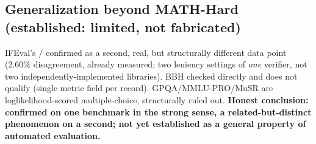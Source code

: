 \subsection{Generalization beyond MATH-Hard (established: limited, not fabricated)}
\label{sec:results-generalization}

IFEval's / confirmed as a second, real,
but structurally different data point (2.60\% disagreement, already
measured; two leniency settings of \emph{one} verifier, not two
independently-implemented libraries). BBH checked directly and does not
qualify (single metric field per record). GPQA/MMLU-PRO/MuSR are
loglikelihood-scored multiple-choice, structurally ruled out.
\textbf{Honest conclusion: confirmed on one benchmark in the strong sense, a
related-but-distinct phenomenon on a second; not yet established as a
general property of automated evaluation.}
